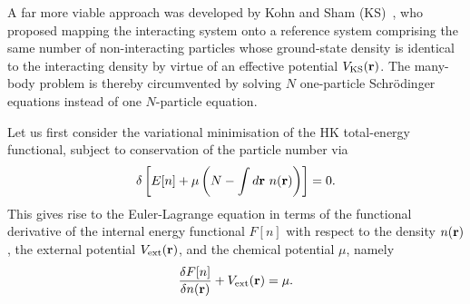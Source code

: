 A far more viable approach was developed 
by Kohn and Sham (KS)~\cite{PhysRev.140.A1133}, 
who proposed mapping the interacting system onto a 
reference system comprising the same number of non-interacting particles 
whose ground-state density is identical to the interacting density  
by virtue of an effective potential $V_\textrm{KS}({\bf r})$.
%
The many-body problem is thereby circumvented 
by solving $N$ one-particle Schr\"{o}dinger equations 
instead of one $N$-particle equation.

Let us first consider the variational minimisation of 
the HK total-energy functional, 
subject to conservation of the particle number via
%
\begin{equation}
\delta\left[E[n]+\mu\left(N-\int d\br\ n(\br)\right)\right]=0.
\label{eq:hk_total_energy_functional}
\end{equation}
%
This gives rise to the Euler-Lagrange equation 
in terms of the functional derivative of the  
internal energy functional $F[n]$ 
with respect to the density $n({\bf r})$, 
the external potential $V_\textrm{ext}({\bf r})$, 
and the chemical potential $\mu$, namely 
%
\begin{equation}
\frac{\delta F[n]}{\delta n({\bf r})}+V_\textrm{ext}({\bf r})=\mu.
\label{eq:euler-lagrange}
\end{equation}
%

